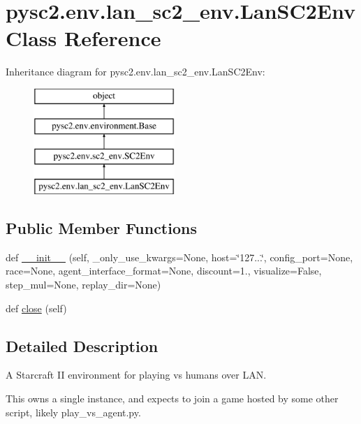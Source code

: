 \hypertarget{classpysc2_1_1env_1_1lan__sc2__env_1_1_lan_s_c2_env}{}\section{pysc2.\+env.\+lan\+\_\+sc2\+\_\+env.\+Lan\+S\+C2\+Env Class Reference}
\label{classpysc2_1_1env_1_1lan__sc2__env_1_1_lan_s_c2_env}
Inheritance diagram for pysc2.\+env.\+lan\+\_\+sc2\+\_\+env.\+Lan\+S\+C2\+Env\+:\begin{figure}[H]
\begin{center}
\leavevmode
\includegraphics[height=4.000000cm]{classpysc2_1_1env_1_1lan__sc2__env_1_1_lan_s_c2_env}
\end{center}
\end{figure}
\subsection*{Public Member Functions}
\begin{DoxyCompactItemize}
\item 
def \mbox{\hyperlink{classpysc2_1_1env_1_1lan__sc2__env_1_1_lan_s_c2_env_af811660c93bbe7d4660fcdc7317bb57f}{\+\_\+\+\_\+init\+\_\+\+\_\+}} (self, \+\_\+only\+\_\+use\+\_\+kwargs=None, host=\char`\"{}127...\char`\"{}, config\+\_\+port=None, race=None, agent\+\_\+interface\+\_\+format=None, discount=1., visualize=False, step\+\_\+mul=None, replay\+\_\+dir=None)
\item 
def \mbox{\hyperlink{classpysc2_1_1env_1_1lan__sc2__env_1_1_lan_s_c2_env_afe3313585911c165f7128cb6c8afa21f}{close}} (self)
\end{DoxyCompactItemize}


\subsection{Detailed Description}
\begin{DoxyVerb}A Starcraft II environment for playing vs humans over LAN.

This owns a single instance, and expects to join a game hosted by some other
script, likely play_vs_agent.py.
\end{DoxyVerb}
 

